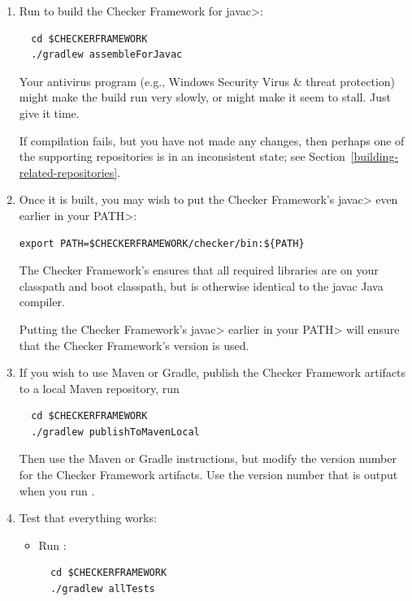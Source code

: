 \begin{enumerate}

\item
Run  to build the Checker Framework for \<javac>:

\begin{Verbatim}
  cd $CHECKERFRAMEWORK
  ./gradlew assembleForJavac
\end{Verbatim}

\noindent
Your antivirus program (e.g., Windows Security Virus \& threat protection)
might make the build run very slowly, or might make it seem to stall.  Just
give it time.

If compilation fails, but you have not made any changes, then perhaps one
of the supporting repositories is in an inconsistent state; see
Section~\ref{building-related-repositories}.

\item
Once it is built, you may wish to put the Checker Framework's \<javac>
even earlier in your \<PATH>:

\begin{Verbatim}
export PATH=$CHECKERFRAMEWORK/checker/bin:${PATH}
\end{Verbatim}

The Checker Framework's  ensures that all required
libraries are on your classpath and boot classpath, but is otherwise
identical to the javac Java compiler.

Putting the Checker Framework's \<javac> earlier in your \<PATH> will
ensure that the Checker Framework's version is used.

\item
If you wish to use Maven or Gradle, publish the Checker Framework artifacts to a local Maven repository, run
\begin{Verbatim}
  cd $CHECKERFRAMEWORK
  ./gradlew publishToMavenLocal
\end{Verbatim}
Then use the Maven or Gradle instructions, but modify the version number for the Checker Framework artifacts.
Use the version number that is output when you run .

\item Test that everything works:

  \begin{itemize}

  \item Run :
\begin{Verbatim}
  cd $CHECKERFRAMEWORK
  ./gradlew allTests
\end{Verbatim}


\end{itemize}
\end{enumerate}
